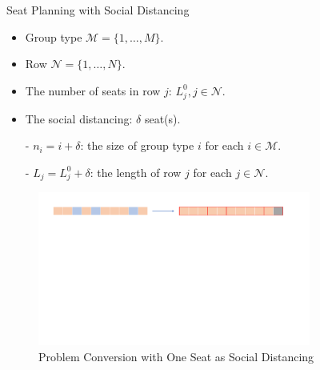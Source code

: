 \begin{frame}{Seat Planning with Social Distancing}
  \begin{itemize}  
    \item Group type $\mathcal{M} = \{1, \ldots, M\}$.
    \item Row $\mathcal{N} = \{1, \ldots, N\}$.
    \item The number of seats in row $j$: $L_j^{0}, j \in \mathcal{N}$.
    \item The social distancing: $\delta$ seat(s).
    \item[-] $n_i = i + \delta$: the size of group type $i$ for each $i \in \mathcal{M}$.
    \item[-] $L_j = L_j^{0} + \delta$: the length of row $j$ for each $j \in \mathcal{N}$.
    \end{itemize}
    
    \begin{figure}[ht]
      \centering
      \includegraphics[width = 0.8\textwidth]{./images/dummy_seat.pdf}
      \caption{Problem Conversion with One Seat as Social Distancing}
  \end{figure}
  \end{frame}

